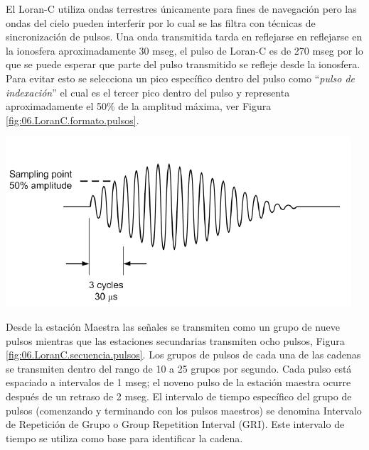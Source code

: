 \begin{minipage}[c]{0.65\linewidth}
  El Loran-C utiliza ondas terrestres únicamente para fines de
  navegación pero las ondas del cielo pueden interferir por lo cual se
  las filtra con técnicas de sincronización de pulsos.  Una onda
  transmitida tarda en reflejarse en reflejarse en la ionosfera
  aproximadamente 30 mseg, el pulso de Loran-C es de 270 mseg por lo
  que se puede esperar que parte del pulso transmitido se refleje
  desde la ionosfera.  Para evitar esto se selecciona un pico
  específico dentro del pulso como ``\emph{pulso de indexación}'' el
  cual es el tercer pico dentro del pulso y representa aproximadamente
  el 50\% de la amplitud máxima, ver Figura \ref{fig:06.LoranC.formato.pulsos}.
\end{minipage}\hspace{1em}
\begin{minipage}[c]{0.30\linewidth}
  \includegraphics[width=\linewidth]{06.radionavegacion/Imagenes/06.01.Loran/06_LoranC_pulso_formato.png}
  \label{fig:06.LoranC.formato.pulsos}

\end{minipage}

Desde la estación Maestra las señales se transmiten  como un grupo de nueve pulsos mientras que las estaciones secundarias transmiten ocho pulsos, Figura \ref{fig:06.LoranC.secuencia.pulsos}. Los grupos de pulsos de cada una de las cadenas se transmiten dentro del rango de 10 a 25 grupos por segundo. Cada pulso está espaciado a intervalos de 1 mseg; el noveno pulso de la estación maestra ocurre después de un retraso de 2 mseg. El intervalo de tiempo específico del grupo de pulsos (comenzando y terminando con los pulsos maestros) se denomina Intervalo de Repetición de Grupo o Group Repetition Interval (GRI). Este intervalo de tiempo se utiliza como base para identificar la cadena. 

